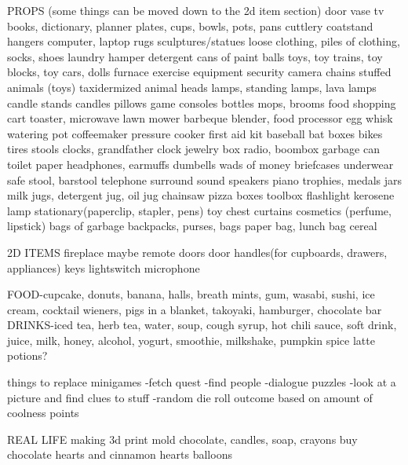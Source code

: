 PROPS (some things can be moved down to the 2d item section)
door
vase
tv
books, dictionary, planner
plates, cups, bowls, pots, pans
cuttlery
coatstand
hangers
computer, laptop
rugs
sculptures/statues
loose clothing, piles of clothing, socks, shoes
laundry hamper
detergent
cans of paint
balls
toys, toy trains, toy blocks, toy cars, dolls
furnace
exercise equipment
security camera
chains
stuffed animals (toys)
taxidermized animal heads
lamps, standing lamps, lava lamps
candle stands
candles
pillows
game consoles
bottles
mops, brooms
food
shopping cart
toaster, microwave
lawn mower
barbeque
blender, food processor
egg whisk
watering pot
coffeemaker
pressure cooker
first aid kit
baseball bat
boxes
bikes
tires
stools
clocks, grandfather clock
jewelry box
radio, boombox
garbage can
toilet paper
headphones, earmuffs
dumbells
wads of money
briefcases
underwear
safe
stool, barstool
telephone
surround sound speakers
piano
trophies, medals
jars
milk jugs, detergent jug, oil jug
chainsaw
pizza boxes
toolbox
flashlight
kerosene lamp
stationary(paperclip, stapler, pens)
toy chest
curtains
cosmetics (perfume, lipstick)
bags of garbage
backpacks, purses, bags
paper bag, lunch bag
cereal


2D ITEMS
fireplace maybe
remote
doors
door handles(for cupboards, drawers, appliances)
keys
lightswitch
microphone

FOOD-cupcake, donuts, banana, halls, breath mints, gum, wasabi, sushi, ice cream, cocktail wieners, pigs in a blanket, takoyaki, hamburger, chocolate bar
DRINKS-iced tea, herb tea, water, soup, cough syrup, hot chili sauce, soft drink, juice, milk, honey, alcohol, yogurt, smoothie, milkshake, pumpkin spice latte
potions?




things to replace minigames
-fetch quest
-find people
-dialogue puzzles
-look at a picture and find clues to stuff
-random die roll outcome based on amount of coolness points




REAL LIFE making 3d print mold
chocolate, candles, soap, crayons
buy chocolate hearts and cinnamon hearts
balloons